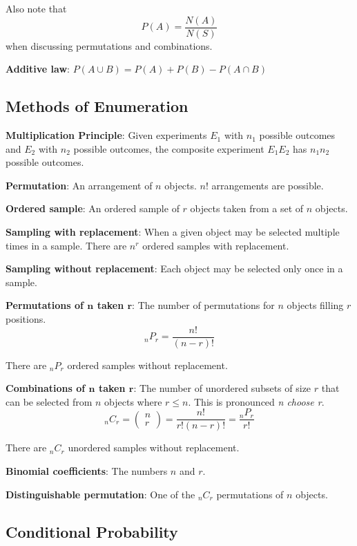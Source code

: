 \documentclass{article}
\begin{document}
\begin{multicols*}{2}
Also note that
\[P(A) = \frac{N(A)}{N(S)}\]
when discussing permutations and combinations.

\textbf{Additive law}: $P(A \cup B) = P(A) + P(B) - P(A \cap B)$

\subsection{Methods of Enumeration}

\textbf{Multiplication Principle}: Given experiments $E_1$ with $n_1$ possible outcomes and $E_2$ with $n_2$ possible outcomes, the composite experiment $E_1 E_2$ has $n_1 n_2$ possible outcomes.

\textbf{Permutation}: An arrangement of $n$ objects. $n!$ arrangements are possible.

\textbf{Ordered sample}: An ordered sample of $r$ objects taken from a set of $n$ objects.

\textbf{Sampling with replacement}: When a given object may be selected multiple times in a sample. There are $n^r$ ordered samples with replacement.

\textbf{Sampling without replacement}: Each object may be selected only once in a sample.

\textbf{Permutations of $\mathbf{n}$ taken $\mathbf{r}$}:
The number of permutations for $n$ objects filling $r$ positions.
\[{}_n P_r = \frac{n!}{(n-r)!}\]

There are ${}_n P_r$ ordered samples without replacement.

\textbf{Combinations of $\mathbf{n}$ taken $\mathbf{r}$}: The number of unordered subsets of size $r$ that can be selected from $n$ objects where $r \leq n$. This is pronounced \textit{n choose r}.
\[{}_n C_r = \begin{pmatrix}
    n \\
    r
\end{pmatrix} = \frac{n!}{r! (n-r)!} = \frac{{}_n P_r}{r!}\]

There are ${}_n C_r$ unordered samples without replacement.

\textbf{Binomial coefficients}: The numbers $n$ and $r$.

\textbf{Distinguishable permutation}: One of the ${}_n C_r$ permutations of $n$ objects.

\subsection{Conditional Probability}



\end{multicols*}
\end{document}
